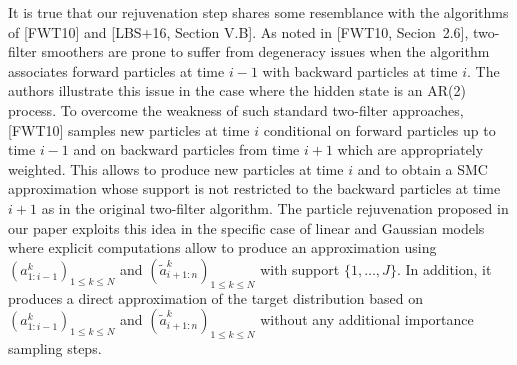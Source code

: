 {\em 

It is true that our rejuvenation step shares some resemblance with the algorithms of [FWT10] and [LBS+16, Section V.B]. As noted in [FWT10, Secion~2.6], two-filter smoothers are prone to suffer from degeneracy issues when the algorithm associates forward particles at time $i-1$ with backward particles at time $i$. The authors illustrate this issue in the case where the hidden state is an AR(2) process. To overcome the weakness of such standard two-filter approaches, [FWT10] samples new particles at time $i$ conditional on forward particles up to time $i-1$ and on backward particles from time $i+1$ which are appropriately weighted. This allows to produce new particles at time $i$ and to obtain a SMC approximation whose support is not restricted to the backward particles at time $i+1$ as in the original two-filter algorithm.  The particle rejuvenation proposed in our paper exploits this idea in the specific case of linear and Gaussian models where explicit computations allow to produce an approximation using $(a^k_{1:i-1})_{1\le k \le N}$ and $(\tilde{a}^k_{i+1:n})_{1\le k \le N}$ with support $\{1,\ldots,J\}$. In addition, it produces a direct approximation of the target distribution based on $(a^k_{1:i-1})_{1\le k \le N}$ and $(\tilde{a}^k_{i+1:n})_{1\le k \le N}$  without any additional importance sampling steps.


}
